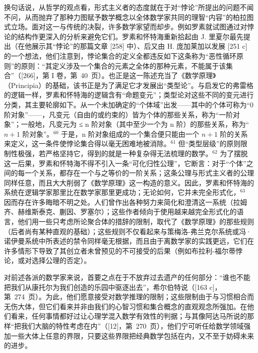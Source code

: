 换句话说，从哲学的观点看，形式主义者的态度就在于对“悖论”所提出的问题不闻不问，从而抛弃了那种力图赋予数学概念以全体数学家共同的理智“内容”的柏拉图式立场。面对这一与传统的决裂，许多数学家望而却步。例如罗素就试图通过对悖论的结构作更深入的分析来避免它们。罗素和怀特海重新拾起由 J. 里夏尔最先提出（在他展示其“悖论”的那篇文章 {[}258{]} 中）、后又由 H. 庞加莱加以发展 {[}251 c{]} 的一个想法，他们注意到，悖论集合的定义全都违反如下这条称为“恶性循环原则”的原则：“其定义涉及一个集合的元素之全体的那种元素，不能属于该集合”（{[}266{]}，第 I 卷，第~40~页）。也正是这一陈述充当了《数学原理》（Principia）的基础，该书正是为了满足它才发展出“类型论”。与启发它的弗雷格的逻辑一样，罗素和怀特海的逻辑含有“命题变元”；类型论对这些不同的变元进行分类，其主要轮廓如下。从一个未加确定的“个体域”出发——其中的个体可称为“0 阶对象”——，凡变元（自由的或约束的）皆为个体的那些关系，称为“一阶对象”；一般地，凡变元为 ≤ n 阶对象（其中至少一个为 n 阶）的那些关系，称为“\(n + 1\) 阶对象”。\(^{60}\) 于是，n 阶对象组成的一个集合便只能由一个 \(n + 1\) 阶的关系来定义，这一条件使悖论集合得以毫无困难地被消除。\(^{61}\) 但“类型层级”的原则限制性极强，若严格坚持它，得到的就是一种复杂得无法梳理的数学。\(^{62}\) 为了摆脱这一后果，罗素和怀特海不得不引入一条“可化归性公理”，它断言：对于“个体”之间的每一个关系，都存在一个与之等价的一阶关系；这条公理与形式主义者的公理同样任意，而且大大削弱了《数学原理》这一构造的意义。因此，罗素和怀特海的系统在逻辑学家那里比在数学家那里更成功；无论如何，它并未完全形式化，\(^{63}\) 因而存在许多晦暗不明之处。人们曾作出各种努力来简化和澄清这一系统（拉姆齐、赫维斯泰克、蒯因、罗塞尔）；这些作者倾向于使用越来越完全形式化的语言，他们用一些只考虑所论聚合体的措辞的限制，取代了《数学原理》的那些规则（后者尚有某种直观的基础）；这些规则不仅看起来与策梅洛-弗兰克尔系统或冯·诺伊曼系统中所表述的禁令同样毫无根据，而且由于离数学家的实践更远，它们在许多情形下导致了其创立者未曾预见的不可接受的后果（例如布拉利-福尔蒂悖论，或对选择公理的否定）。

对前述各派的数学家来说，首要之点在于不放弃过去遗产的任何部分：“谁也不能把我们从康托尔为我们创造的乐园中驱逐出去”，希尔伯特说（{[}163 c{]}，第~274~页）。为此，他们愿意接受对数学推理的限制；这些限制由于与习惯相合而无伤大体，但它们看来并非由我们的心智习惯和集合概念的直观观念所强加。在他们看来，任何事情都好过让心理学混入数学有效性的判据；与其像阿达马所说的那样“把我们大脑的特性考虑在内”（{[}12{]}，第~270~页），他们宁可听任给数学领域强加一些大体上任意的界限，只要这些界限把经典数学包括在内，又不至于妨碍未来的进步。

